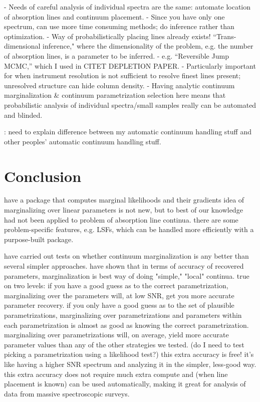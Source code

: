 \documentclass[manuscript]{aastex62}
\begin{document}
- Needs of careful analysis of individual spectra are the same: automate location of absorption lines and continuum placement.
- Since you have only one spectrum, can use more time consuming methods; do inference rather than optimization.
- Way of probabilistically placing lines already exists! ``Trans-dimensional inference," where the dimensionality of the problem, e.g. the number of absorption lines, is a parameter to be inferred.
- e.g. ``Reversible Jump MCMC,'' which I used in CITET DEPLETION PAPER.
- Particularly important for when instrument resolution is not sufficient to resolve finest lines present; unresolved structure can hide column density.
- Having analytic continuum marginalization \& continuum parametrization selection here means that probabilistic analysis of individual spectra/small samples really can be automated and blinded.

: need to explain difference between my automatic continuum handling stuff and other peoples' automatic continuum handling stuff.

\section{Conclusion}
\label{sec:conclusion}
have a package that computes marginal likelihoods and their gradients
idea of marginalizing over linear parameters is not new, but to best of our knowledge had not been applied to problem of absorption line continua.
there are some problem-specific features, e.g. LSFs, which can be handled more efficiently with a purpose-built package.

have carried out tests on whether continuum marginalization is any better than several simpler approaches.
 have shown that in terms of accuracy of recovered parameters, marginalization is best way of doing "simple," "local" continua.
true on two levels: if you have a good guess as to the correct parametrization, marginalizing over the parameters will, at low SNR, get you more accurate parameter recovery.
if you only have a good guess as to the set of plausible parametrizations, marginalizing over parametrizations and parameters within each parametrization is almost as good as knowing the correct parametrization.
marginalizing over parametrizations will, on average, yield more accurate parameter values than any of the other strategies we tested. (do I need to test picking a parametrization using a likelihood test?)
this extra accuracy is free! it's like having a higher SNR spectrum and analyzing it in the simpler, less-good way.
this extra accuracy does not require much extra compute and (when line placement is known) can be used automatically, making it great for analysis of data from massive spectroscopic surveys.
\end{document}
